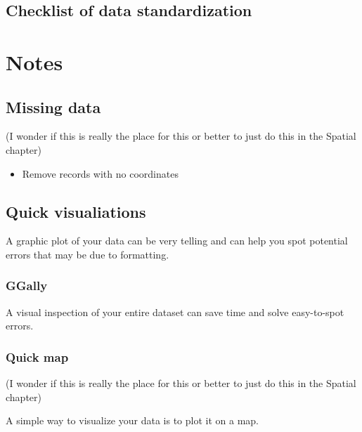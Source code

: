 \documentclass[
  letterpaper,
  DIV=11,
  numbers=noendperiod,
  oneside]{scrreprt}
\providecommand{\tightlist}{%
  \setlength{\itemsep}{0pt}\setlength{\parskip}{0pt}}\usepackage{longtable,booktabs,array}
\begin{document}
\hypertarget{checklist-of-data-standardization}{%
\section{Checklist of data
standardization}\label{checklist-of-data-standardization}}


\hypertarget{notes-1}{%
\chapter{Notes}\label{notes-1}}

\hypertarget{missing-data}{%
\section{Missing data}\label{missing-data}}

(I wonder if this is really the place for this or better to just do this
in the Spatial chapter)

\begin{itemize}
\tightlist
\item
  Remove records with no coordinates
\end{itemize}

\hypertarget{quick-visualiations}{%
\section{Quick visualiations}\label{quick-visualiations}}

A graphic plot of your data can be very telling and can help you spot
potential errors that may be due to formatting.

\hypertarget{ggally}{%
\subsection{GGally}\label{ggally}}

A visual inspection of your entire dataset can save time and solve
easy-to-spot errors.

\hypertarget{quick-map}{%
\subsection{Quick map}\label{quick-map}}

(I wonder if this is really the place for this or better to just do this
in the Spatial chapter)

A simple way to visualize your data is to plot it on a map.
\end{document}
